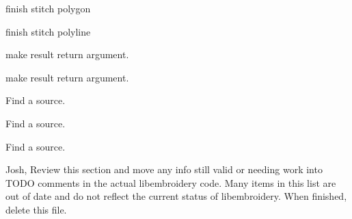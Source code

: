 \begin{DoxyRefList}
%
finish stitch polygon  
\item[Member \mbox{\hyperlink{fill_8c_a9ae9d5d7dfbb2ab361dc37970b7eb2f2}{emb\+Pattern\+\_\+stitch\+Polyline}} (Emb\+Pattern $\ast$p, Emb\+Polyline polyline, int thread\+\_\+index, int style)]\label{todo__todo000209}%
%
finish stitch polyline  
\item[Member \mbox{\hyperlink{vector_8c_a0a4af07bfac410623cf77a35a11550b1}{emb\+Vector\+\_\+multiply}} (Emb\+Vector vector, Emb\+Real magnitude, Emb\+Vector $\ast$result)]\label{todo__todo000225}%
%
make result return argument.  
\item[Member \mbox{\hyperlink{vector_8c_aaad72d90c58592e330de08139aee5077}{emb\+Vector\+\_\+normalize}} (Emb\+Vector vector, Emb\+Vector $\ast$result)]\label{todo__todo000224}%
%
make result return argument.  
\item[File \mbox{\hyperlink{format__art_8c}{format\+\_\+art.c}} ]\label{todo__todo000226}%
%
Find a source.  
\item[File \mbox{\hyperlink{format__bmc_8c}{format\+\_\+bmc.c}} ]\label{todo__todo000227}%
%
Find a source.  
\item[File \mbox{\hyperlink{format__cnd_8c}{format\+\_\+cnd.c}} ]\label{todo__todo000228}%
%
Find a source.  
\item[Page \mbox{\hyperlink{formats}{Formats}} ]\label{todo__todo000184}%
%
Josh, Review this section and move any info still valid or needing work into TODO comments in the actual libembroidery code. Many items in this list are out of date and do not reflect the current status of libembroidery. When finished, delete this file.


\end{DoxyRefList}

